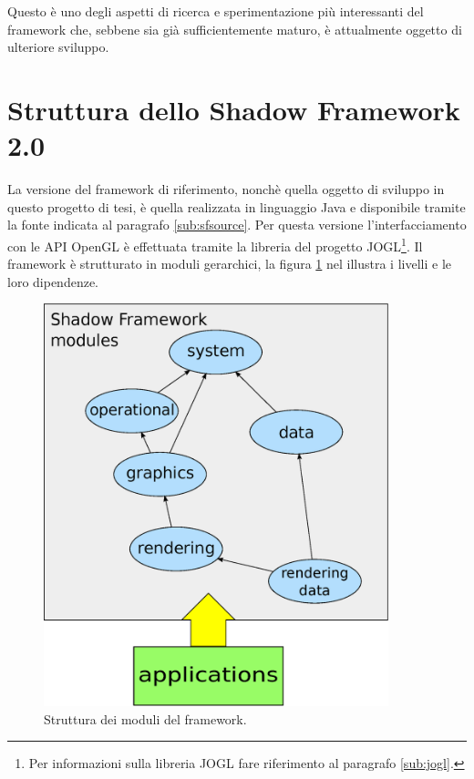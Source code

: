 Questo \`e uno degli aspetti di ricerca e sperimentazione pi\`u interessanti del framework che, sebbene sia gi\`a sufficientemente maturo, \`e attualmente oggetto di ulteriore sviluppo.

\section{Struttura dello Shadow Framework 2.0}
\label{sec:sfstructure}
La versione del framework di riferimento, nonch\`e quella oggetto di sviluppo in questo progetto di tesi, \`e quella realizzata in linguaggio Java e disponibile tramite la fonte indicata al paragrafo \ref{sub:sfsource}. Per questa versione l'interfacciamento con le \ac{API} OpenGL \`e effettuata tramite la libreria del progetto JOGL\footnote{Per informazioni sulla libreria JOGL fare riferimento al paragrafo \ref{sub:jogl}.}.
Il framework \`e strutturato in moduli gerarchici, la figura \ref{f:sfstructure} nel illustra i livelli e le loro dipendenze.

\begin{figure}
\begin{center}
\includegraphics[width=10cm]{Immagini/sfstructure}
\caption{Struttura dei moduli del framework.\label{f:sfstructure}} 
\end{center} 
\end{figure}

